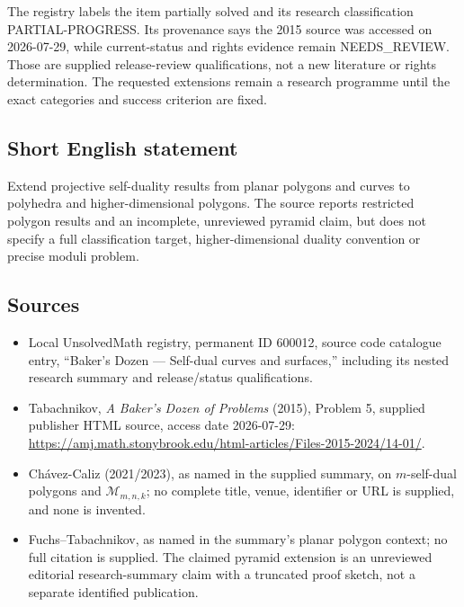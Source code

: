 \documentclass[11pt]{article}
\begin{document}
The registry labels the item partially solved and its research classification PARTIAL-PROGRESS. Its provenance says the 2015 source was accessed on 2026-07-29, while current-status and rights evidence remain NEEDS\_REVIEW. Those are supplied release-review qualifications, not a new literature or rights determination. The requested extensions remain a research programme until the exact categories and success criterion are fixed.
\subsection{Short English statement}
Extend projective self-duality results from planar polygons and curves to polyhedra and higher-dimensional polygons. The source reports restricted polygon results and an incomplete, unreviewed pyramid claim, but does not specify a full classification target, higher-dimensional duality convention or precise moduli problem.
\subsection{Sources}
\begin{itemize}
\item Local UnsolvedMath registry, permanent ID 600012, source code catalogue entry, ``Baker's Dozen --- Self-dual curves and surfaces,'' including its nested research summary and release/status qualifications.
\item Tabachnikov, \emph{A Baker's Dozen of Problems} (2015), Problem 5, supplied publisher HTML source, access date 2026-07-29: \url{https://amj.math.stonybrook.edu/html-articles/Files-2015-2024/14-01/}.
\item Ch\'avez-Caliz (2021/2023), as named in the supplied summary, on \(m\)-self-dual polygons and \(\mathcal M_{m,n,k}\); no complete title, venue, identifier or URL is supplied, and none is invented.
\item Fuchs--Tabachnikov, as named in the summary's planar polygon context; no full citation is supplied. The claimed pyramid extension is an unreviewed editorial research-summary claim with a truncated proof sketch, not a separate identified publication.
\end{itemize}
\end{document}
